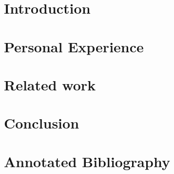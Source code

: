 \documentclass[a4paper, 11pt]{article} %
\begin{document}
\section*{Introduction}


\section*{Personal Experience}


\section*{Related work}


\section*{Conclusion}



\section*{Annotated Bibliography}







\end{document}
